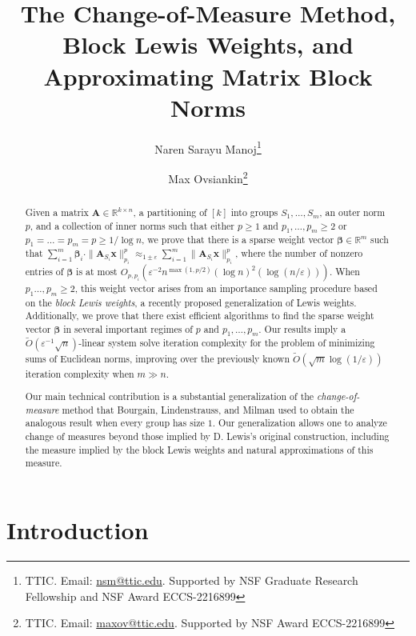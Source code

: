 \documentclass[11pt]{article}
\numberwithin{equation}{section}
\begin{document}
\title{The Change-of-Measure Method, Block Lewis Weights, and Approximating Matrix Block Norms}
\author{Naren Sarayu Manoj\thanks{TTIC. Email: \url{nsm@ttic.edu}. Supported by NSF Graduate Research Fellowship and NSF Award ECCS-2216899}\and Max Ovsiankin\thanks{TTIC. Email: \url{maxov@ttic.edu}. Supported by NSF Award ECCS-2216899}}
\maketitle
\begin{abstract}\noindent
Given a matrix $\mathbf{A} \in \mathbb{R}^{k \times n}$, a partitioning of $[k]$ into groups $S_1,\dots,S_m$, an outer norm $p$, and a collection of inner norms such that either $p \ge 1$ and $p_1,\dots,p_m \ge 2$ or $p_1=\dots=p_m=p \ge 1/\log n$, we prove that there is a sparse weight vector $\bm{\beta} \in \mathbb{R}^{m}$ such that $\sum_{i=1}^m \bm{\beta}_i \cdot \|\mathbf{A}_{S_i}\bm{x}\|_{p_i}^p \approx_{1\pm\varepsilon} \sum_{i=1}^m \|\mathbf{A}_{S_i}\bm{x}\|_{p_i}^p$, where the number of nonzero entries of $\bm{\beta}$ is at most $O_{p,p_i}(\varepsilon^{-2}n^{\max(1,p/2)}(\log n)^2(\log(n/\varepsilon)))$. When $p_1\dots,p_m \ge 2$, this weight vector arises from an importance sampling procedure based on the \textit{block Lewis weights}, a recently proposed generalization of Lewis weights. Additionally, we prove that there exist efficient algorithms to find the sparse weight vector $\bm{\beta}$ in several important regimes of $p$ and $p_1,\dots,p_m$. Our results imply a $\widetilde{O}(\varepsilon^{-1}\sqrt{n})$-linear system solve iteration complexity for the problem of minimizing sums of Euclidean norms, improving over the previously known $\widetilde{O}(\sqrt{m}\log({1/\varepsilon}))$ iteration complexity when $m \gg n$.

Our main technical contribution is a substantial generalization of the \textit{change-of-measure} method that Bourgain, Lindenstrauss, and Milman used to obtain the analogous result when every group has size $1$. Our generalization allows one to analyze change of measures beyond those implied by D. Lewis's original construction, including the measure implied by the block Lewis weights and natural approximations of this measure.
\end{abstract}

\newpage
\tableofcontents
\newpage

\section{Introduction}
\end{document}
